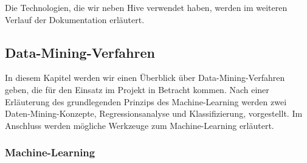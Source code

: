 Die Technologien, die wir neben Hive verwendet haben, werden im weiteren Verlauf der Dokumentation erläutert.


\subsection{Data-Mining-Verfahren}
In diesem Kapitel werden wir einen Überblick über Data-Mining-Verfahren geben, die für den Einsatz im Projekt in Betracht kommen. Nach einer Erläuterung des grundlegenden Prinzips des Machine-Learning werden zwei Daten-Mining-Konzepte, Regressionsanalyse und Klassifizierung, vorgestellt. Im Anschluss werden mögliche Werkzeuge zum Machine-Learning erläutert.

\subsubsection{Machine-Learning}
